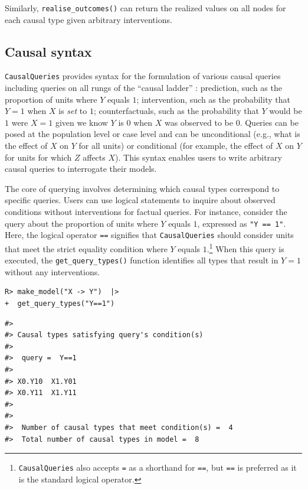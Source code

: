 \documentclass[
  11pt,
  article]{jss}
\begin{document}
Similarly, \texttt{realise\_outcomes()} can return the realized values
on all nodes for each causal type given arbitrary interventions.

\subsection{Causal syntax}\label{sec-syntax}

\texttt{CausalQueries} provides syntax for the formulation of various
causal queries including queries on all rungs of the ``causal ladder''
\citep{pearl_causality_2009}: prediction, such as the proportion of
units where \(Y\) equals \(1\); intervention, such as the probability
that \(Y = 1\) when \(X\) is \emph{set} to \(1\); counterfactuals, such
as the probability that \(Y\) would be \(1\) were \(X = 1\) given we
know \(Y\) is \(0\) when \(X\) was observed to be \(0\). Queries can be
posed at the population level or case level and can be unconditional
(e.g., what is the effect of \(X\) on \(Y\) for all units) or
conditional (for example, the effect of \(X\) on \(Y\) for units for
which \(Z\) affects \(X\)). This syntax enables users to write arbitrary
causal queries to interrogate their models.

The core of querying involves determining which causal types correspond
to specific queries. Users can use logical statements to inquire about
observed conditions without interventions for factual queries. For
instance, consider the query about the proportion of units where \(Y\)
equals \(1\), expressed as \texttt{"Y\ ==\ 1"}. Here, the logical
operator \texttt{==} signifies that \texttt{CausalQueries} should
consider units that meet the strict equality condition where \(Y\)
equals \(1\).\footnote{\texttt{CausalQueries} also accepts \texttt{=} as
  a shorthand for \texttt{==}, but \texttt{==} is preferred as it is the
  standard logical operator.} When this query is executed, the
\texttt{get\_query\_types()} function identifies all types that result
in \(Y=1\) without any interventions.

\begin{verbatim}
R> make_model("X -> Y")  |> 
+  get_query_types("Y==1")
\end{verbatim}

\begin{verbatim}
#> 
#> Causal types satisfying query's condition(s)  
#> 
#>  query =  Y==1 
#> 
#> X0.Y10  X1.Y01
#> X0.Y11  X1.Y11
#> 
#> 
#>  Number of causal types that meet condition(s) =  4
#>  Total number of causal types in model =  8
\end{verbatim}
\end{document}
